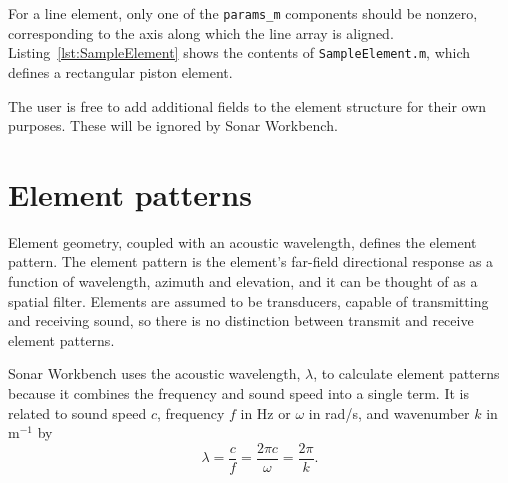 For a line element, only one of the \texttt{params\_m} components should be nonzero, corresponding to the axis along which the line array is aligned. Listing~\ref{lst:SampleElement} shows the contents of \texttt{SampleElement.m}, which defines a rectangular piston element.



The user is free to add additional fields to the element structure for their own purposes. These will be ignored by Sonar Workbench.

\section{Element patterns}

Element geometry, coupled with an acoustic wavelength, defines the element pattern. The element pattern is the element's far-field directional response as a function of wavelength, azimuth and elevation, and it can be thought of as a spatial filter. Elements are assumed to be transducers, capable of transmitting and receiving sound, so there is no distinction between transmit and receive element patterns. 

Sonar Workbench uses the acoustic wavelength, $\lambda$, to calculate element patterns because it combines the frequency and sound speed into a single term. It is related to sound speed $c$, frequency $f$ in Hz or $\omega$ in rad/s, and wavenumber $k$ in m$^{-1}$ by
\begin{equation*}
\lambda = \frac{c}{f} = \frac{2\pi{c}}{\omega} = \frac{2\pi}{k}.
\end{equation*}


